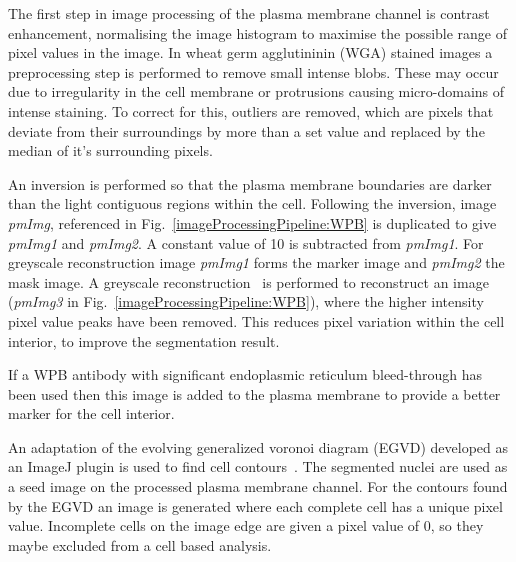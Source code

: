 The first step in image processing of the plasma membrane channel is contrast enhancement, normalising the image histogram to maximise the possible range of pixel values in the image. In wheat germ agglutininin (WGA) stained images a preprocessing step is performed to remove small intense blobs. These may occur due to irregularity in the cell membrane or protrusions causing  micro-domains of intense staining. To correct for this, outliers are removed, which are pixels that deviate from their surroundings by more than a set value and replaced by the median of it's surrounding pixels.

An inversion is performed so that the plasma membrane boundaries are darker than the light contiguous regions within the cell. Following the inversion, image \emph{pmImg}, referenced in Fig.~\ref{imageProcessingPipeline:WPB} is duplicated to give \emph{pmImg1} and \emph{pmImg2}. A constant value of 10 is subtracted from \emph{pmImg1}. For greyscale reconstruction image \emph{pmImg1} forms the marker image and \emph{pmImg2} the mask image. A greyscale reconstruction~\cite{Vincent1993} is performed to reconstruct an image (\emph{pmImg3} in Fig.~\ref{imageProcessingPipeline:WPB}), where the higher intensity pixel value peaks have been removed. This reduces pixel variation within the cell interior, to improve the segmentation result. 

If a WPB antibody with significant endoplasmic reticulum bleed-through has been used then this image is added to the plasma membrane to provide a better marker for the cell interior.

An adaptation of the evolving generalized voronoi diagram (EGVD) developed as an ImageJ plugin is used to find cell contours~\cite{Yu2010}. The segmented nuclei are used as a seed image on the processed plasma membrane channel. For the contours found by the EGVD an image is generated where each complete cell has a unique pixel value. Incomplete cells on the image edge are given a pixel value of 0, so they maybe excluded from a cell based analysis.

